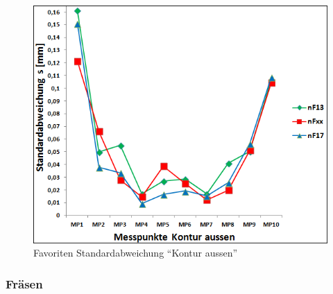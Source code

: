 \documentclass[12pt,a4paper,parskip]{scrartcl}
\begin{document}
\begin{figure}[hbtp]
\centering
\includegraphics[width=.8\textwidth]{standardnF13nFxxnF17.png}
\caption{Favoriten Standardabweichung "`Kontur aussen"' }
\label{fig:favstrb}
\end{figure}

\subsubsection{Fräsen}
\end{document}
